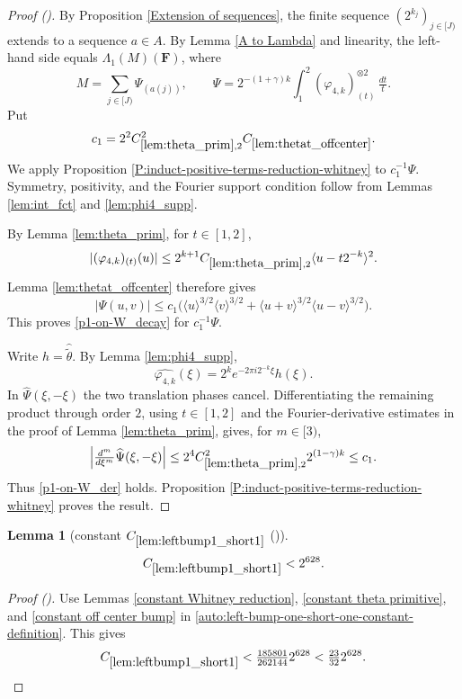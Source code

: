 \documentclass[12pt,reqno]{amsart}
\newcommand{\auto}{{({\tiny\faCar})}}
\theoremstyle{plain}
\newtheorem{lemma}[theorem]{Lemma}
\numberwithin{equation}{section}
\theoremstyle{remark}
\newcommand{\uses}[1]{}
\newcommand{\usesdefs}[1]{}
\newcommand{\F}{\mathbf{F}}
\begin{document}
\begin{proof}[Proof \auto]
By Proposition \ref{Extension of sequences}, the finite sequence $(2^{k_j})_{j\in[J)}$ extends to a sequence $a\in A$. By Lemma \ref{A to Lambda} and linearity, the left-hand side equals $\Lambda_1(M)(\F)$, where
\[
M=\sum_{j\in[J)}\Psi_{(a(j))},
\qquad
\Psi=2^{-(1+\gamma)k}\int_1^2(\varphi_{4,k})_{(t)}^{\otimes2}\,\tfrac{dt}{t}.
\]
Put
\[
c_1=2^2C_{\ref{lem:theta_prim},2}^2C_{\ref{lem:thetat_offcenter}}.
\]
We apply Proposition \ref{P:induct-positive-terms-reduction-whitney} to $c_1^{-1}\Psi$. Symmetry, positivity, and the Fourier support condition follow from Lemmas \ref{lem:int_fct} and \ref{lem:phi4_supp}.

By Lemma \ref{lem:theta_prim}, for $t\in[1,2]$,
\[
|(\varphi_{4,k})_{(t)}(u)|
\le2^{k+1}C_{\ref{lem:theta_prim},2}
\langle u-t2^{-k}\rangle^2.
\]
Lemma \ref{lem:thetat_offcenter} therefore gives
\[
|\Psi(u,v)|
\le c_1\bigl(
\langle u\rangle^{3/2}\langle v\rangle^{3/2}
+\langle u+v\rangle^{3/2}\langle u-v\rangle^{3/2}
\bigr).
\]
This proves \eqref{p1-on-W_decay} for $c_1^{-1}\Psi$.

Write $h=\widehat{\widetilde\theta}$. By Lemma \ref{lem:phi4_supp},
\[
\widehat{\varphi_{4,k}}(\xi)
=2^ke^{-2\pi i2^{-k}\xi}h(\xi).
\]
In $\widehat\Psi(\xi,-\xi)$ the two translation phases cancel. Differentiating the remaining product through order $2$, using $t\in[1,2]$ and the Fourier-derivative estimates in the proof of Lemma \ref{lem:theta_prim}, gives, for $m\in[3)$,
\[
\left|\tfrac{d^m}{d\xi^m}\widehat\Psi(\xi,-\xi)\right|
\le2^4C_{\ref{lem:theta_prim},2}^2 2^{(1-\gamma)k}
\le c_1.
\]
Thus \eqref{p1-on-W_der} holds. Proposition \ref{P:induct-positive-terms-reduction-whitney} proves the result.
\end{proof}

\begin{lemma}[constant $C_{\ref{lem:leftbump1_short1}}$ \auto]\label{constant left bump one short one}\uses{constant Whitney reduction,constant theta primitive,constant off center bump,lem:leftbump1_short1}\usesdefs{}
\begin{equation}\label{constant left bump one short one bound}
C_{\ref{lem:leftbump1_short1}}
<2^{628}.
\end{equation}
\end{lemma}
\begin{proof}[Proof \auto]
Use Lemmas \ref{constant Whitney reduction}, \ref{constant theta primitive}, and \ref{constant off center bump} in \eqref{auto:left-bump-one-short-one-constant-definition}. This gives
\[
C_{\ref{lem:leftbump1_short1}}
<\tfrac{185801}{262144}2^{628}
<\tfrac{23}{32}2^{628}.
\]
\end{proof}
\end{document}
